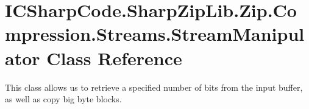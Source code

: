 \hypertarget{class_i_c_sharp_code_1_1_sharp_zip_lib_1_1_zip_1_1_compression_1_1_streams_1_1_stream_manipulator}{}\section{I\+C\+Sharp\+Code.\+Sharp\+Zip\+Lib.\+Zip.\+Compression.\+Streams.\+Stream\+Manipulator Class Reference}
\label{class_i_c_sharp_code_1_1_sharp_zip_lib_1_1_zip_1_1_compression_1_1_streams_1_1_stream_manipulator}


This class allows us to retrieve a specified number of bits from the input buffer, as well as copy big byte blocks.  


